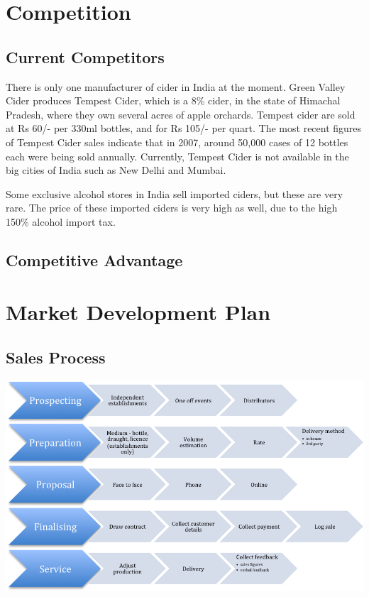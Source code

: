 \documentclass[11pt]{article}
\begin{document}
\section{Competition}
	\subsection{Current Competitors}
There is only one manufacturer of cider in India at the moment. Green Valley Cider produces Tempest Cider, which is a 8\% cider, in the state of Himachal Pradesh, where they own several acres of apple orchards. Tempest cider are sold at Rs 60/- per 330ml bottles, and for Rs 105/- per quart. The most recent figures of Tempest Cider sales indicate that in 2007, around 50,000 cases of 12 bottles each were being sold annually. Currently, Tempest Cider is not available in the big cities of India such as New Delhi and Mumbai.

\noindent Some exclusive alcohol stores in India sell imported ciders, but these are very rare. The price of these imported ciders is very high as well, due to the high 150\% alcohol import tax.

  \subsection{Competitive Advantage}

\newpage
\section{Market Development Plan}
  \subsection{Sales Process}
  \includegraphics[width=\textwidth,keepaspectratio]{./process.png}
\end{document}
